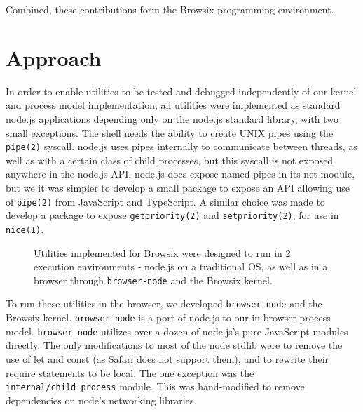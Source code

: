 \documentclass{acm_proc_article-sp}
\begin{document}
Combined, these contributions form the Browsix programming
environment.


\section{Approach}

In order to enable utilities to be tested and debugged independently
of our kernel and process model implementation, all utilities were
implemented as standard node.js applications depending only on the
node.js standard library, with two small exceptions.  The shell needs
the ability to create UNIX pipes using the \texttt{pipe(2)} syscall.
node.js uses pipes internally to communicate between threads, as well
as with a certain class of child processes, but this syscall is not
exposed anywhere in the node.js API.  node.js does expose named pipes
in its net module, but we it was simpler to develop a small package to
expose an API allowing use of \texttt{pipe(2)} from JavaScript and
TypeScript.  A similar choice was made to develop a package to expose
\texttt{getpriority(2)} and \texttt{setpriority(2)}, for use in
\texttt{nice(1)}.

\begin{figure}
\centering
{}
\caption{Utilities implemented for Browsix were designed to run in 2
  execution environments - node.js on a traditional OS, as well as in
  a browser through \texttt{browser-node} and the Browsix kernel.}
\end{figure}

To run these utilities in the browser, we developed
\texttt{browser-node} and the Browsix kernel.  \texttt{browser-node}
is a port of node.js to our in-browser process model.
\texttt{browser-node} utilizes over a dozen of node.js's
pure-JavaScript modules directly.  The only modifications to most of
the node stdlib were to remove the use of let and const (as Safari
does not support them), and to rewrite their require statements to be
local.  The one exception was the \texttt{internal/child\_process}
module.  This was hand-modified to remove dependencies on node's
networking libraries.
\end{document}

